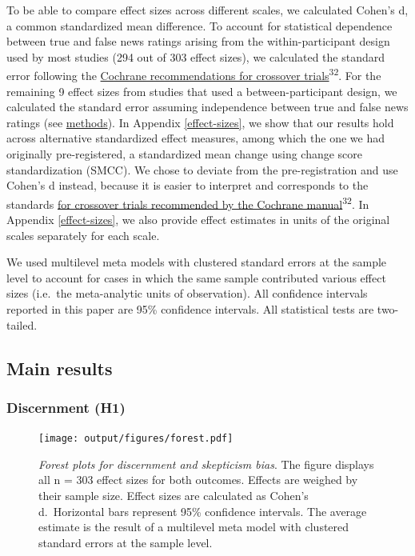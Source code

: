 \documentclass[
  man]{apa6}
\begin{document}
To be able to compare effect sizes across different scales, we calculated Cohen's d, a common standardized mean difference. To account for statistical dependence between true and false news ratings arising from the within-participant design used by most studies (294 out of 303 effect sizes), we calculated the standard error following the \href{https://training.cochrane.org/handbook/current/chapter-23\#section-23-2-7-3}{Cochrane recommendations for crossover trials}\textsuperscript{32}. For the remaining 9 effect sizes from studies that used a between-participant design, we calculated the standard error assuming independence between true and false news ratings (see \hyperref[methods]{methods}). In Appendix \ref{effect-sizes}, we show that our results hold across alternative standardized effect measures, among which the one we had originally pre-registered, a standardized mean change using change score standardization (SMCC). We chose to deviate from the pre-registration and use Cohen's d instead, because it is easier to interpret and corresponds to the standards \href{https://training.cochrane.org/handbook/current/chapter-23\#section-23-2-7-3}{for crossover trials recommended by the Cochrane manual}\textsuperscript{32}. In Appendix \ref{effect-sizes}, we also provide effect estimates in units of the original scales separately for each scale.

We used multilevel meta models with clustered standard errors at the sample level to account for cases in which the same sample contributed various effect sizes (i.e.~the meta-analytic units of observation). All confidence intervals reported in this paper are 95\% confidence intervals. All statistical tests are two-tailed.

\subsection{Main results}\label{main-results}

\subsubsection{Discernment (H1)}\label{discernment-h1}



\begin{figure}
\centering
\texttt{[image: output/figures/forest.pdf]}
\caption{\label{fig:forest}\emph{Forest plots for discernment and skepticism bias}. The figure displays all n = 303 effect sizes for both outcomes. Effects are weighed by their sample size. Effect sizes are calculated as Cohen's d.~Horizontal bars represent 95\% confidence intervals. The average estimate is the result of a multilevel meta model with clustered standard errors at the sample level.}
\end{figure}
\end{document}
